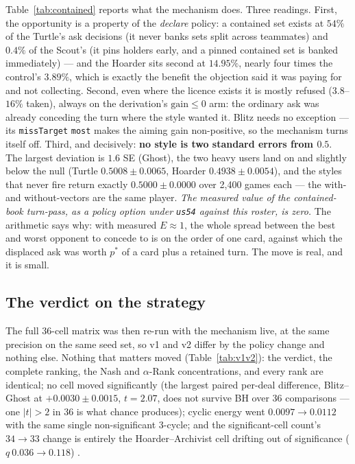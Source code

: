 \documentclass[11pt]{article}
\newcommand{\code}[1]{\texttt{#1}}
\newcommand{\usff}{\code{us54}}
\begin{document}
Table~\ref{tab:contained} reports what the mechanism does. Three readings. First, the
opportunity is a property of the \emph{declare} policy: a contained set exists at $54\%$ of
the Turtle's ask decisions (it never banks sets split across teammates) and $0.4\%$ of the
Scout's (it pins holders early, and a pinned contained set is banked immediately) --- and the
Hoarder sits second at $14.95\%$, nearly four times the control's $3.89\%$, which is exactly
the benefit the objection said it was paying for and not collecting. Second, even where the
licence exists it is mostly refused ($3.8$--$16\%$ taken), always on the derivation's
$\mathrm{gain} \le 0$ arm: the ordinary ask was already conceding the turn where the style
wanted it. Blitz needs no exception --- its \code{missTarget} \code{most} makes the aiming
gain non-positive, so the mechanism turns itself off. Third, and decisively: \textbf{no style
is two standard errors from $0.5$}. The largest deviation is $1.6$ SE (Ghost), the two heavy
users land on and slightly below the null (Turtle $0.5008 \pm 0.0065$, Hoarder $0.4938 \pm
0.0054$), and the styles that never fire return exactly $0.5000 \pm 0.0000$ over 2{,}400
games each --- the with- and without-vectors are the same player. \emph{The measured value of
the contained-book turn-pass, as a policy option under \usff{} against this roster, is zero.}
The arithmetic says why: with measured $E \approx 1$, the whole spread between the best and
worst opponent to concede to is on the order of one card, against which the displaced ask was
worth $p^\ast$ of a card plus a retained turn. The move is real, and it is small.

\subsection{The verdict on the strategy}

The full 36-cell matrix was then re-run with the mechanism live, at the same precision on the
same seed set, so v1 and v2 differ by the policy change and nothing else. Nothing that
matters moved (Table~\ref{tab:v1v2}): the verdict, the complete ranking, the Nash and
$\alpha$-Rank concentrations, and every rank are identical; no cell moved significantly (the
largest paired per-deal difference, Blitz--Ghost at $+0.0030 \pm 0.0015$, $t = 2.07$, does
not survive BH over 36 comparisons --- one $|t| > 2$ in 36 is what chance produces); cyclic
energy went $0.0097 \to 0.0112$ with the same single non-significant 3-cycle; and the
significant-cell count's $34 \to 33$ change is entirely the Hoarder--Archivist cell drifting
out of significance ($q\ 0.036 \to 0.118$) \cite{styles}.
\end{document}
